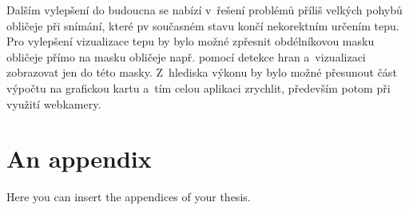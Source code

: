 \documentclass[
  digital, %
  table,   %
%
  lof,     %
  lot,     %
]{fithesis3}
\begin{document}
Dalším vylepšení do budoucna se nabízí v~řešení problémů příliš velkých pohybů obličeje při snímání, které pv současném stavu končí nekorektním určením tepu. Pro vylepšení vizualizace tepu by bylo možné zpřesnit obdélníkovou masku obličeje přímo na masku obličeje např. pomocí detekce hran a~vizualizaci zobrazovat jen do této masky. Z~hlediska výkonu by bylo možné přesunout část výpočtu na grafickou kartu a~tím celou aplikaci zrychlit, především potom při využití webkamery.


\makeatletter\thesis@blocks@clear\makeatother
{} %
\printindex

\appendix %
\chapter{An appendix}
Here you can insert the appendices of your thesis.
\end{document}
